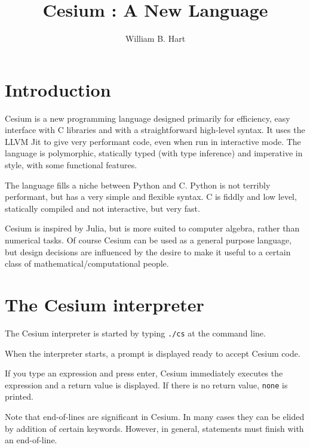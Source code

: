 \documentclass[a4paper,10pt]{article}
\title{Cesium : A New Language}
\author{William B. Hart}
\newcommand{\code}{\lstinline}
\begin{document}
\maketitle
\tableofcontents

\section{Introduction}

Cesium is a new programming language designed primarily for efficiency, easy interface with C libraries
and with a straightforward high-level syntax. It uses the LLVM Jit to give very performant code, even
when run in interactive mode. The language is polymorphic, statically typed (with type inference) and
imperative in style, with some functional features.

The language fills a niche between Python and C. Python is not terribly performant, but has a very
simple and flexible syntax. C is fiddly and low level, statically compiled and not interactive, but very 
fast. 

Cesium is inspired by Julia, but is more suited to computer algebra, rather than numerical tasks.
Of course Cesium can be used as a general purpose language, but design decisions are influenced by the
desire to make it useful to a certain class of mathematical/computational people.

\section{The Cesium interpreter}

The Cesium interpreter is started by typing \code{./cs} at the command line.

When the interpreter starts, a prompt is displayed ready to accept Cesium code.

If you type an expression and press enter, Cesium immediately executes the expression and a return 
value is displayed. If there is no return value, \code{none} is printed.

Note that end-of-lines are significant in Cesium. In many cases they can be elided by addition of
certain keywords. However, in general, statements must finish with an end-of-line.
\end{document}
